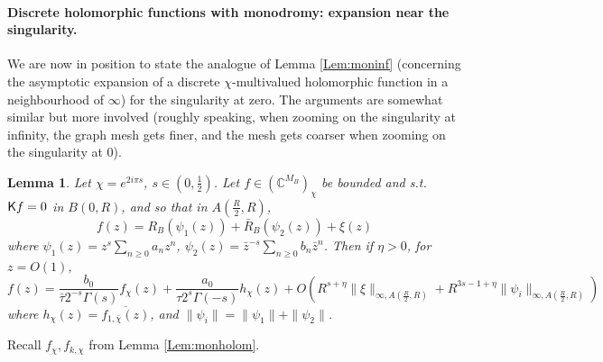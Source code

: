 \documentclass[10pt]{article}
\newcommand{\C}{\mathbb{C}}
\newcommand{\rK}{{\sf K}}
\newtheorem{Lem}[thm]{Lemma}
\begin{document}
\paragraph{Discrete holomorphic functions with monodromy: expansion near the singularity.\\}

We are now in position to state the analogue of Lemma \ref{Lem:moninf} (concerning the asymptotic expansion of a discrete $\chi$-multivalued holomorphic function in a neighbourhood of $\infty$) for the singularity at zero. The arguments are somewhat similar but more involved (roughly speaking, when zooming on the singularity at infinity, the graph mesh gets finer, and the mesh gets coarser when zooming on the singularity at $0$).

\begin{Lem}\label{Lem:monzero}
Let $\chi=e^{2i\pi s}$, $s\in (0,\frac 12)$. Let $f\in(\C^{M_B})_\chi$ be bounded and s.t. $\rK f=0$ in $B(0,R)$, and so that in $A(\frac R2,R)$,
$$f(z)=R_B(\psi_1(z))+\bar R_B(\psi_2(z))+\xi(z)$$
where $\psi_1(z)=z^s\sum_{n\geq 0}a_nz^n$, $\psi_2(z)=\bar z^{-s}\sum_{n\geq 0}b_n\bar z^n$. Then if $\eta>0$, for $z=O(1)$, 
$$f(z)=\frac{b_0}{\bar\tau 2^{-s}\Gamma(s)} f_{\chi}(z)+\frac{a_0}{\tau 2^s\Gamma(-s)} h_\chi(z)+O(R^{s+\eta}\|\xi\|_{\infty,A(\frac R2,R)}+R^{3s-1+\eta}\|\psi_i\|_{\infty,A(\frac R2,R)})$$
where $h_\chi(z)=\overline{f_{1,\bar\chi}(z)}$, and $\|\psi_i\|=\|\psi_1\|+\|\psi_2\|$.
\end{Lem}
Recall $f_\chi, f_{k,\chi}$ from Lemma \ref{Lem:monholom}.
\end{document}
